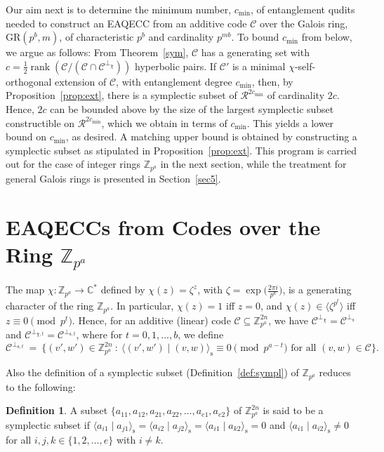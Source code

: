 \documentclass{article}
\DeclareMathOperator{\rank}{rank}
\theoremstyle{remark}
\theoremstyle{definition}
\newtheorem{defin}{Definition}[section]
\numberwithin{equation}{section}
\begin{document}
Our aim next is to determine the minimum number, $c_{\min}$, of entanglement qudits needed to construct an EAQECC from an additive code $\mathcal{C}$ over the Galois ring, $\text{GR}(p^b,m)$, of characteristic $p^b$ and cardinality $p^{mb}$. To bound $c_{\min}$ from below, we argue as follows: From Theorem~\ref{sym}, $\mathcal{C}$ has a generating set with $c = \frac12 \rank(\mathcal{C}/(\mathcal{C} \cap \mathcal{C}^{\perp_\chi}))$ hyperbolic pairs. If $\mathcal{C}'$ is a minimal $\chi$-self-orthogonal extension of $\mathcal{C}$, with entanglement degree $c_{\min}$, then, by Proposition~\ref{prop:ext}, there is a symplectic subset of $\mathcal{R}^{2c_{\min}}$ of cardinality $2c$. Hence, $2c$ can be bounded above by the size of the largest symplectic subset constructible on $\mathcal{R}^{2c_{\min}}$, which we obtain in terms of $c_{\min}$. This yields a lower bound on $c_{\min}$, as desired. A matching upper bound is obtained by constructing a symplectic subset as stipulated in Proposition~\ref{prop:ext}. This program is carried out for the case of integer rings $\mathbb{Z}_{p^a}$ in the next section, while the treatment for general Galois rings is presented in Section~\ref{sec5}.

\section{EAQECCs from Codes over the Ring $\mathbb{Z}_{p^a}$} \label{sec4}

The map $\chi: \mathbb{Z}_{p^a} \to \mathbb{C}^*$ defined by $\chi(z) = \zeta^z$, with $\zeta=\exp\bigl(\frac{2 \pi i}{p^a}\bigr)$, is a generating character of the ring $\mathbb{Z}_{p^a}$. In particular, $\chi(z) = 1$ iff $z = 0$, and $\chi(z) \in \langle \zeta^{p^t} \rangle $ iff $z \equiv 0 \pmod{p^t}$. Hence, for an additive (linear) code $\mathcal{C} \subseteq \mathbb{Z}_{p^a}^{2n}$, we have $\mathcal{C}^{\perp_\chi}=\mathcal{C}^{\perp_{\mathrm{s}}}$ and $\mathcal{C}^{\perp_{\chi,t}}=\mathcal{C}^{\perp_{\mathrm{s},t}}$, where for $t = 0,1,\ldots,b$, we define
\begin{equation}
\label{def:Cperp_st} 
\mathcal{C}^{\perp_{\mathrm{s},t}} \ = \  \{(v',w') \in \mathbb{Z}_{p^a}^{2n} ~:~ \langle(v',w') \mid (v,w) \rangle_{\mathrm{s}} \equiv 0 \!\!\!\! \pmod{p^{a-t}} \text{ for all } (v,w) \in \mathcal{C}\}.
\end{equation}


Also the definition of a symplectic subset (Definition~\ref{def:sympl}) of $\mathbb{Z}_{p^a}$ reduces to the following:
\begin{defin} \label{def:sympl2} A subset $\{a_{11},a_{12},a_{21},a_{22},\ldots,a_{e1},a_{e2}\}$
 of $\mathbb{Z}_{p^a}^{2n}$ is said to be a symplectic subset if
  $\langle a_{i1} \mid a_{j1} \rangle_{\text{s}} = \langle a_{i2} \mid a_{j2} \rangle_{\text{s}} = \langle a_{i1} \mid a_{k 2} \rangle_{\text{s}} = 0$ and  $\langle a_{i1} \mid a_{i2} \rangle_{\text{s}} \neq 0$ for all $i ,j, k \in \{1,2,\ldots,e\}$ with $i \neq k.$
 \end{defin}
\end{document}

